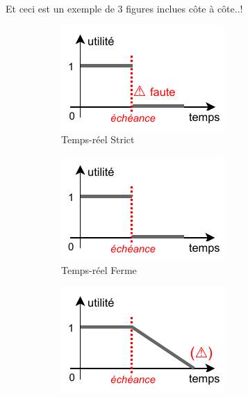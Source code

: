 \documentclass[french, a4paper, 11pt, twoside, pdftex]{StyleThese}
\begin{document}
Et ceci est un exemple de 3 figures inclues côte à côte..!
\begin{figure}[ht!]
    \centering
    \begin{subfigure}{.3\textwidth} \centering
        \includegraphics[width=\linewidth]{schemas/SdF_TempsReelDUR}
        \caption[]{Temps-réel Strict}
        \label{fig:tempReelDur}
    \end{subfigure}
    \begin{subfigure}{.3\textwidth} \centering
        \includegraphics[width=\linewidth]{schemas/SdF_TempsReelFERME}
        \caption[]{Temps-réel Ferme}
        \label{fig:tempReelFerme}
    \end{subfigure}
    \begin{subfigure}{.3\textwidth} \centering
        \includegraphics[width=\linewidth]{schemas/SdF_TempsReelMOU}

\end{subfigure}
\end{figure}
\end{document}
